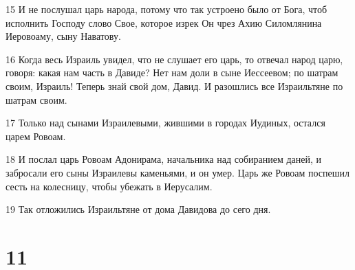 \par 15 И не послушал царь народа, потому что так устроено было от Бога, чтоб исполнить Господу слово Свое, которое изрек Он чрез Ахию Силомлянина Иеровоаму, сыну Наватову.
\par 16 Когда весь Израиль увидел, что не слушает его царь, то отвечал народ царю, говоря: какая нам часть в Давиде? Нет нам доли в сыне Иессеевом; по шатрам своим, Израиль! Теперь знай свой дом, Давид. И разошлись все Израильтяне по шатрам своим.
\par 17 Только над сынами Израилевыми, жившими в городах Иудиных, остался царем Ровоам.
\par 18 И послал царь Ровоам Адонирама, начальника над собиранием даней, и забросали его сыны Израилевы каменьями, и он умер. Царь же Ровоам поспешил сесть на колесницу, чтобы убежать в Иерусалим.
\par 19 Так отложились Израильтяне от дома Давидова до сего дня.

\chapter{11}

